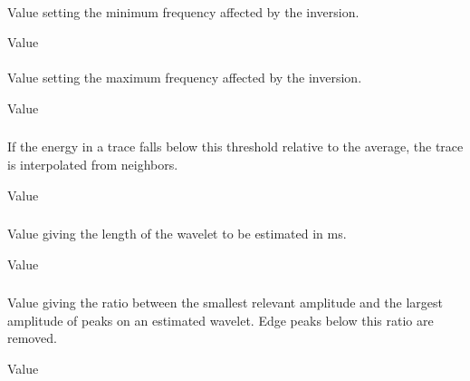 \paragraph{}
 \slist
   \item \Description Value setting the minimum frequency affected by the inversion.
   \item \Argument Value
   \item {}
 \elist

\paragraph{}
 \slist
   \item \Description Value setting the maximum frequency affected by the inversion.
   \item \Argument Value
   \item {}
 \elist

\subsubsection{}
 \slist
   \item \Description If the energy in a trace falls below this threshold relative to the average, the trace is interpolated from neighbors.
   \item \Argument Value
   \item {}
 \elist

\subsubsection{}
 \slist
   \item \Description Value giving the length of the wavelet to be estimated in ms.
   \item \Argument Value
   \item {}
 \elist

\subsubsection{}
 \slist
   \item \Description Value giving the ratio between the smallest relevant amplitude and the largest amplitude of peaks on an estimated wavelet. Edge peaks below this ratio are removed.
   \item \Argument Value
   \item {}
 \elist

